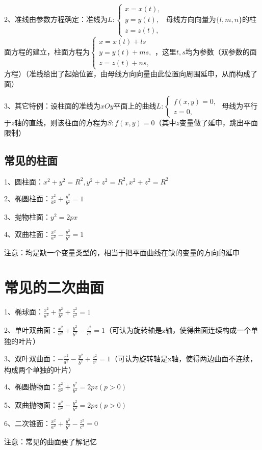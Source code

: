 2、准线由参数方程确定：准线为$L:\left\{\begin{array}{l}x=x(t), \\ y=y(t),  \\ z=z(t), \end{array}\right.$ 母线方向向量为$\{l, m, n\}$的柱面方程的建立，柱面方程为$\left\{\begin{array}{l}x=x(t)+l s \\ y=y(t)+m s, \\ z=z(t)+n s,\end{array}\right.$，这里$t, s$均为参数（双参数的面方程）（准线给出了起始位置，由母线方向向量由此位置向周围延申，从而构成了面）

3、其它特例：设柱面的准线为$x O y$平面上的曲线$L:\left\{\begin{array}{l}f(x, y)=0,\\ z=0,\end{array}\right.$ 母线为平行于$z$轴的直线，则该柱面的方程为$S: f(x, y)=0$（其中$z$变量做了延申，跳出平面限制）



\subsection{常见的柱面}

1、圆柱面：$x^{2}+y^{2}=R^{2}, y^{2}+z^{2}=R^{2}, x^{2}+z^{2}=R^{2}$

2、椭圆柱面：$\frac{x^{2}}{a^{2}}+\frac{y^{2}}{b^{2}}=1$

3、抛物柱面：$y^{2}=2 p x$

4、双曲柱面：$\frac{x^{2}}{a^{2}}-\frac{y^{2}}{b^{2}}=1$

注意：均是缺一个变量类型的，相当于把平面曲线在缺的变量的方向的延申

\section{常见的二次曲面}

1、椭球面：$\frac{x^{2}}{a^{2}}+\frac{y^{2}}{b^{2}}+\frac{z^{2}}{c^{2}}=1$

2、单叶双曲面：$\frac{x^{2}}{a^{2}}+\frac{y^{2}}{b^{2}}-\frac{z^{2}}{c^{2}}=1$（可认为旋转轴是z轴，使得曲面连续构成一个单独的叶片）

3、双叶双曲面：$-\frac{x^{2}}{a^{2}}-\frac{y^{2}}{b^{2}}+\frac{z^{2}}{c^{2}}=1$（可认为旋转轴是x轴，使得两边曲面不连续，构成两个单独的叶片）

4、椭圆抛物面：$\frac{x^{2}}{a^{2}}+\frac{y^{2}}{b^{2}}=2 p z(p>0)$

5、双曲抛物面：$\frac{x^{2}}{a^{2}}-\frac{y^{2}}{b^{2}}=2 p z(p>0)$

6、二次锥面：$\frac{x^{2}}{a^{2}}+\frac{y^{2}}{b^{2}}-\frac{z^{2}}{c^{2}}=0$

注意：常见的曲面要了解记忆

